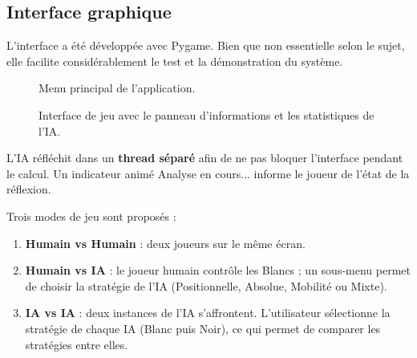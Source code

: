 \documentclass[12pt, a4paper]{article}
\begin{document}
\subsection{Interface graphique}

L'interface a été développée avec Pygame. Bien que non essentielle selon le sujet, elle facilite considérablement le test et la démonstration du système.

\begin{figure}[H]
    \centering
    \caption{Menu principal de l'application.}
    \label{fig:menu}
\end{figure}

\begin{figure}[H]
    \centering
    \caption{Interface de jeu avec le panneau d'informations et les statistiques de l'IA.}
    \label{fig:partie}
\end{figure}

L'IA réfléchit dans un \textbf{thread séparé} afin de ne pas bloquer l'interface pendant le calcul. Un indicateur animé \og Analyse en cours... \fg{} informe le joueur de l'état de la réflexion.

Trois modes de jeu sont proposés :
\begin{enumerate}
    \item \textbf{Humain vs Humain} : deux joueurs sur le même écran.
    \item \textbf{Humain vs IA} : le joueur humain contrôle les Blancs ; un sous-menu permet de choisir la stratégie de l'IA (Positionnelle, Absolue, Mobilité ou Mixte).
    \item \textbf{IA vs IA} : deux instances de l'IA s'affrontent. L'utilisateur sélectionne la stratégie de chaque IA (Blanc puis Noir), ce qui permet de comparer les stratégies entre elles.
\end{enumerate}
\end{document}
